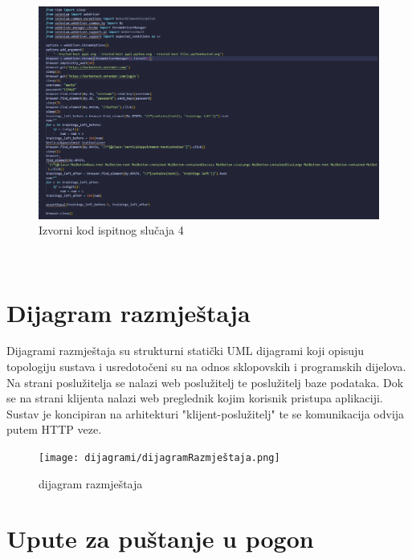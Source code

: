 				
					\begin{figure}[H]
					\includegraphics[scale=0.4]{dijagrami/test4.png} %
					\centering
					\caption{Izvorni kod ispitnog slučaja 4}
					\label{fig:ispitnislucaj4}
				\end{figure}\\
		
		\section{Dijagram razmještaja}
			
			{Dijagrami razmještaja su strukturni statički UML dijagrami koji opisuju topologiju sustava i usredotočeni su na odnos sklopovskih i programskih dijelova. Na strani poslužitelja se nalazi web poslužitelj te poslužitelj baze podataka. Dok se na strani klijenta nalazi web preglednik kojim korisnik pristupa aplikaciji. Sustav je koncipiran na arhitekturi "klijent-poslužitelj" te se komunikacija odvija putem HTTP veze}. \\
			
			
			\begin{figure}[H]
				\texttt{[image: dijagrami/dijagramRazmještaja.png]} %
				\centering
				\caption{dijagram razmještaja }
				\label{fig:diagramrazmještaja}
			\end{figure}
			
			\eject 
		
		\section{Upute za puštanje u pogon}
		
